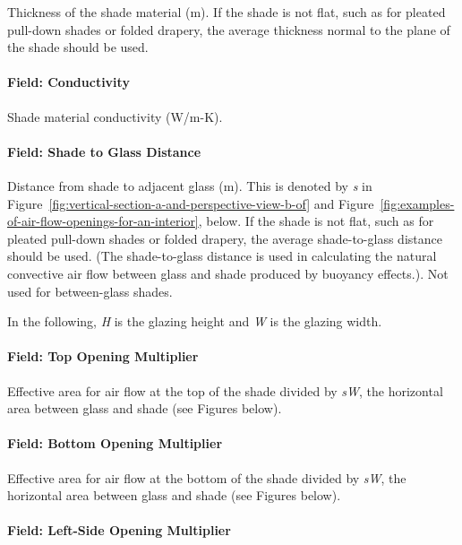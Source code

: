 Thickness of the shade material (m). If the shade is not flat, such as for pleated pull-down shades or folded drapery, the average thickness normal to the plane of the shade should be used.

\paragraph{Field: Conductivity}\label{field-conductivity-3}

Shade material conductivity (W/m-K).

\paragraph{Field: Shade to Glass Distance}\label{field-shade-to-glass-distance}

Distance from shade to adjacent glass (m). This is denoted by \emph{s} in Figure~\ref{fig:vertical-section-a-and-perspective-view-b-of} and Figure~\ref{fig:examples-of-air-flow-openings-for-an-interior}, below. If the shade is not flat, such as for pleated pull-down shades or folded drapery, the average shade-to-glass distance should be used. (The shade-to-glass distance is used in calculating the natural convective air flow between glass and shade produced by buoyancy effects.). Not used for between-glass shades.

In the following, \emph{H} is the glazing height and \emph{W} is the glazing width.

\paragraph{Field: Top Opening Multiplier}\label{field-top-opening-multiplier}

Effective area for air flow at the top of the shade divided by \emph{sW}, the horizontal area between glass and shade (see Figures below).

\paragraph{Field: Bottom Opening Multiplier}\label{field-bottom-opening-multiplier}

Effective area for air flow at the bottom of the shade divided by \emph{sW}, the horizontal area between glass and shade (see Figures below).

\paragraph{Field: Left-Side Opening Multiplier}\label{field-left-side-opening-multiplier}

